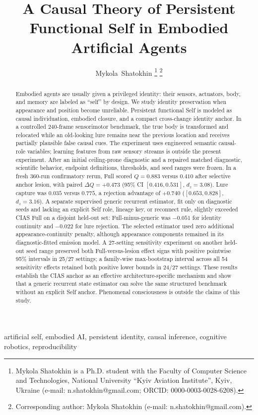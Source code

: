 \documentclass[journal]{IEEEtran}
\title{A Causal Theory of Persistent Functional Self in Embodied Artificial Agents}
\author{Mykola~Shatokhin%
\thanks{Mykola Shatokhin is a Ph.D. student with the Faculty of Computer Science and Technologies, National University ``Kyiv Aviation Institute'', Kyiv, Ukraine (e-mail: n.shatokhin@gmail.com; ORCID: 0000-0003-0028-6208).}%
\thanks{Corresponding author: Mykola Shatokhin (e-mail: n.shatokhin@gmail.com).}}
\begin{document}
\maketitle

\begin{abstract}
Embodied agents are usually given a privileged identity: their sensors, actuators, body, and memory are labeled as ``self'' by design. We study identity preservation when appearance and position become unreliable. Persistent functional Self is modeled as causal individuation, embodied closure, and a compact cross-change identity anchor. In a controlled 240-frame sensorimotor benchmark, the true body is transformed and relocated while an old-looking lure remains near the previous location and receives partially plausible false causal cues. The experiment uses engineered semantic causal-role variables; learning features from raw sensory streams is outside the present experiment. After an initial ceiling-prone diagnostic and a repaired matched diagnostic, scientific behavior, endpoint definitions, thresholds, and seed ranges were frozen. In a fresh 360-run confirmatory rerun, Full scored $Q=0.883$ versus $0.410$ after selective anchor lesion, with paired $\Delta Q=+0.473$ (95\% CI $[0.416,0.531]$, $d_z=3.08$). Lure capture was $0.035$ versus $0.775$, a rejection advantage of $+0.740$ ($[0.653,0.828]$, $d_z=3.16$). A separate supervised generic recurrent estimator, fit only on diagnostic seeds and lacking an explicit Self role, lineage key, or reconnect rule, slightly exceeded CIAS Full on a disjoint held-out set: Full-minus-generic was $-0.051$ for identity continuity and $-0.022$ for lure rejection. The selected estimator used zero additional appearance-continuity penalty, although appearance components remained in its diagnostic-fitted emission model. A 27-setting sensitivity experiment on another held-out seed range preserved both Full-versus-lesion effect signs with positive pointwise 95\% intervals in 25/27 settings; a family-wise max-bootstrap interval across all 54 sensitivity effects retained both positive lower bounds in 24/27 settings. These results establish the CIAS anchor as an effective architecture-specific mechanism and show that a generic recurrent state estimator can solve the same structured benchmark without an explicit Self anchor. Phenomenal consciousness is outside the claims of this study.
\end{abstract}

\begin{IEEEkeywords}
artificial self, embodied AI, persistent identity, causal inference, cognitive robotics, reproducibility
\end{IEEEkeywords}
\end{document}
